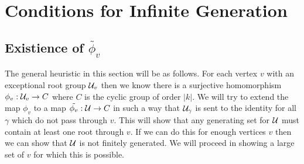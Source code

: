 \documentclass[class=book, crop=false,12 pt]{standalone}
\begin{document}
\chapter{Conditions for Infinite Generation}
\section{Existience of $\tilde{\phi_v}$}
The general heuristic in this section will be as follows. For each vertex $v$ with an exceptional root group $\mathcal{U}_v$ then we know there is a surjective homomorphism $\phi_v:\mathcal{U}_v \to C$ where $C$ is the cyclic group of order $|k|.$ We will try to extend the map $\phi_v$ to a map $\tilde{\phi_v}:\mathcal{U}\to C$ in such a way that $\mathcal{U}_\gamma$ is sent to the identity for all $\gamma$ which do not pass through $v.$ This will show that any generating set for $\mathcal{U}$ must contain at least one root through $v.$ If we can do this for enough vertices $v$ then we can show that $\mathcal{U}$ is not finitely generated. We will proceed in showing a large set of $v$ for which this is possible.
\end{document}
